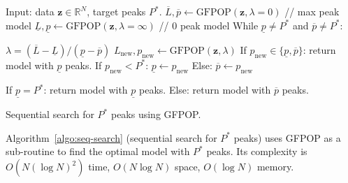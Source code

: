 \documentclass[article]{jss}
\newcommand{\RR}{\mathbb R}
\begin{document}
\begin{algorithm}
    \begin{algorithmic}[1]
  \STATE Input: data $\mathbf z\in\RR^N$, target peaks $P^*$.
  \STATE $\overline L,\overline p \gets \text{GFPOP}(\mathbf z, \lambda=0)$ // max peak model
  \STATE $\underline L,\underline p \gets \text{GFPOP}(\mathbf z, \lambda=\infty)$ // 0 peak model
  \STATE While $\underline p\neq P^*$ and $\overline p\neq P^*$:
  \begin{ALC@g}
    \STATE $\lambda=(\overline L-\underline L)/(\underline p-\overline p)$
    \STATE $L_{\text{new}},p_{\text{new}}\gets\text{GFPOP}(\mathbf z, \lambda)$
    \STATE If $p_{\text{new}}\in\{\underline p, \overline p\}$: return model with $\underline p$ peaks.
    \STATE If $p_{\text{new}} < P^*$: $\underline p\gets p_{\text{new}}$
    \STATE Else: $\overline p\gets p_{\text{new}}$
  \end{ALC@g}
  \STATE If $\underline p=P^*$: return model with $\underline p$ peaks.
  \STATE Else: return model with $\overline p$ peaks.
  \end{algorithmic}
\caption{\label{algo:seq-search}Sequential search for $P^*$ peaks using GFPOP.}
\end{algorithm}

Algorithm~\ref{algo:seq-search} (sequential search for $P^*$ peaks)
uses GFPOP as a sub-routine to find the optimal model with $P^*$
peaks. Its complexity is $O(N(\log N)^2)$ time, $O(N\log N)$ space,
$O(\log N)$ memory.

\end{document}
